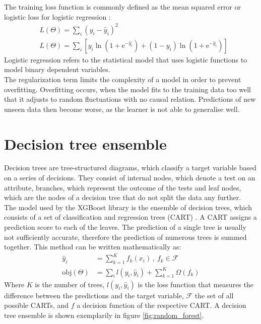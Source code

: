 The training loss function is commonly defined as the mean squared error or logistic loss for logistic regression \cite{logistic}:
\begin{align}
  &L(\Theta) = \sum_i (y_i - \hat{y}_i)^2 \\
  &L(\Theta) = \sum_i [y_i \ln{(1 + \text{e}^{-\hat{y}_i})} + (1 - y_i) \ln{(1 + \text{e}^{-\hat{y}_i})}]
\end{align}
Logistic regression refers to the statistical model that uses logistic functions to model binary dependent variables. \\
The regularization term limits the complexity of a model in order to prevent overfitting. Overfitting occurs, when the model fits to the training data too well that it adjusts
to random fluctuations with no causal relation. Predictions of new unseen data then become worse, as the learner is not able to generalise well.

\section{Decision tree ensemble}
Decision trees are tree-structured diagrams, which classify a target variable based on a series of decisions. They consist of internal nodes, which denote
a test on an attribute, branches, which represent the outcome of the tests and leaf nodes, which are the nodes of a decision tree that do not split the data any further. \\
The model used by the XGBoost library is the ensemble of decision trees, which consists of a set of classification and regression trees (CART) \cite{cart}.
A CART assigns a prediction score to each of the leaves.
The prediction of a single tree is usually not sufficiently accurate,
therefore the prediction of numerous trees is summed together. This method can be written mathematically as:
\begin{align}
  \hat{y}_i &= \sum_{k=1}^K f_k(x_i)\,, \: f_k \in \mathcal{F} \\
  \text{obj}(\Theta) &= \sum_i l(y_i, \hat{y}_i) + \sum_{k=1}^K \Omega(f_k)
\end{align}
Where $K$ is the number of trees, $l(y_i, \hat{y}_i)$ is the loss function that measures the difference between the predictions and the
target variable, $\mathcal{F}$ the set of all possible CARTs, and $f$ a decision function of the respective CART. A decision tree ensemble is shown exemplarily in
figure \ref{fig:random_forest}.

